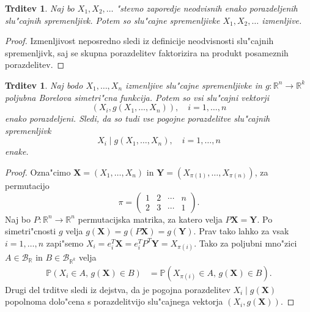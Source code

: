 \documentclass[12pt, a4paper, reqno]{amsart}
\theoremstyle{definition}
\theoremstyle{plain}
\newtheorem{trditev}[definicija]{Trditev}
\newcommand{\R}{\mathbb{R}}
\newcommand{\B}{\mathcal{B}}
\newcommand{\Prob}{\mathbb{P}}
\newcommand{\1}{\mathds{1}}
\begin{document}
    \begin{trditev}
        Naj bo $X_1, X_2, \dots$ "stevno zaporedje neodvisnih enako porazdeljenih slu"cajnih spremenljivk. 
        Potem so slu"cajne spremenljivke $X_1, X_2, \dots$ izmenljive.
    \end{trditev}

    \begin{proof}
        Izmenljivost neposredno sledi iz definicije neodvisnosti slu"cajnih spremenljivk, saj se 
        skupna porazdelitev faktorizira na produkt posameznih porazdelitev.
    \end{proof}

    \begin{trditev}
        Naj bodo $X_1, \dots, X_n$ izmenljive slu"cajne spremenljivke in $g: \R^n \rightarrow \R^k$
        poljubna Borelova simetri"cna funkcija. Potem so vsi slu"cajni vektorji 
        $$
            (X_i, g(X_1, \dots, X_n)),  \quad i = 1, \dots, n
        $$
        enako porazdeljeni. Sledi, da so tudi vse pogojne porazdelitve slu"cajnih spremenljivk
        $$
            X_i\mid g(X_1, \dots, X_n), \quad i = 1, \dots, n
        $$
        enake.
        \label{trd:izmenljivostSimetricnaFunkcija}
    \end{trditev}

    \begin{proof}
        Ozna"cimo $\boldsymbol{X} = (X_1, \dots, X_n)$ in $\boldsymbol{Y} = (X_{\pi(1)}, \dots, X_{\pi(n)})$, za 
        permutacijo
        \begin{equation*}
            \pi = \begin{pmatrix}
                1 & 2 & \cdots & n \\
                2 & 3 & \cdots & 1
            \end{pmatrix}.
        \end{equation*}
        Naj bo $P:\R^n \to \R^n$ permutacijska matrika, za katero velja $P\boldsymbol{X} = \boldsymbol{Y}$.
        Po simetri"cnosti $g$ velja $g(\boldsymbol{X}) = g(P\boldsymbol{X}) = g(\boldsymbol{Y})$.
        Prav tako lahko za vsak $i = 1, \dots, n$ zapi"semo $X_i = e^T_i\boldsymbol{X} = e^T_iP^T\boldsymbol{Y} = X_{\pi(i)}$.
        Tako za poljubni mno"zici $A\in\B_{\R}$ in $B\in\B_{\R^k}$ velja
        \begin{align*}
            \Prob(X_i \in A,\, g(\boldsymbol{X}) \in B) 
            &= \Prob(X_{\pi(i)} \in A,\, g(\boldsymbol{X}) \in B).
        \end{align*}
        Drugi del trditve sledi iz dejstva, da je pogojna porazdelitev $X_i\mid g(\boldsymbol{X})$ 
        popolnoma dolo"cena s porazdelitvijo slu"cajnega vektorja $(X_i, g(\boldsymbol{X}))$.
    \end{proof}
\end{document}
